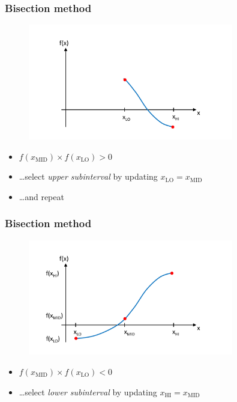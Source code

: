 \documentclass[english,14pt]{beamer}
\begin{document}

\begin{frame}[fragile]

\frametitle{Bisection method}

\vspace*{-15mm}
\begin{figure}[ht]
	\centering
	\includegraphics[width=0.8\textwidth]{figures/bisection2}
\end{figure}
\vspace*{-10mm}
\begin{itemize}
\item[] $f(x_\mathrm{MID}) \times f(x_\mathrm{LO}) > 0$
\item[] \ldots select \emph{upper subinterval} by updating $x_\mathrm{LO} = x_\mathrm{MID}$
\item[] \quad\ldots and repeat
\end{itemize}

\end{frame}


\begin{frame}[fragile]

\frametitle{Bisection method}

\vspace*{-15mm}
\begin{figure}[ht]
	\centering
	\includegraphics[width=0.8\textwidth]{figures/bisection3}
\end{figure}
\vspace*{-10mm}
\begin{itemize}
\item[] $f(x_\mathrm{MID}) \times f(x_\mathrm{LO}) < 0$
\item[] \ldots select \emph{lower subinterval} by updating $x_\mathrm{HI} = x_\mathrm{MID}$
\end{itemize}

\end{frame}
\end{document}
